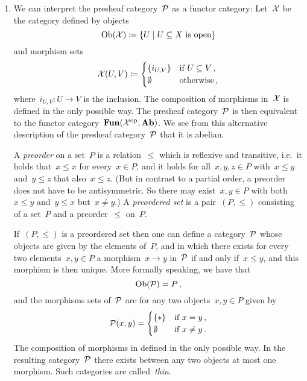 \begin{example}
\begin{enumerate}
    \item
      We can interpret the presheaf category~$\mathcal{P}$ as a functor category:
      Let~$\mathcal{X}$ be the category defined by objects
      \[
                  \Ob(\Xcat)
        \defined  \{
                    U
                  \suchthat
                    \text{$U \subseteq X$ is open}
                  \}
      \]
      and morphism sets
      \[
                  \mathcal{X}(U,V)
        \coloneqq  \begin{cases}
                    \{ i_{U,V} \} & \text{if~$U \subseteq V$} \,, \\
                    \emptyset     & \text{otherwise} \,,
                  \end{cases}
      \]
      where~$i_{U,V} \colon U \to V$ is the inclusion.
      The composition of morphisms in~$\mathcal{X}$ is defined in the only possible way.
      The presheaf category~$\mathcal{P}$ is then equivalent to the functor category~$\mathbf{Fun}(\mathcal{X}^{\mathrm{op}}, \mathbf{Ab})$.
      We see from this alternative description of the presheaf category~$\mathcal{P}$ that it is abelian.
      
      \begin{remark*}
        A \emph{preorder} on a set~$P$ is a relation~$\leq$ which is reflexive and transitive, i.e.\ it holds that~$x \leq x$ for every~$x \in P$, and it holds for all~$x, y, z \in P$ with~$x \leq y$ and~$y \leq z$ that also~$x \leq z$.
        (But in contrast to a partial order, a preorder does not have to be antisymmetric.
        So there may exist~$x, y \in P$ with both~$x \leq y$ and~$y \leq x$ but~$x \neq y$.)
        A \emph{preordered set} is a pair~$(P,\leq)$ consisting of a set~$P$ and a preorder~$\leq$ on~$P$.
        
        If~$(P,\leq)$ is a preordered set then one can define a category~$\mathcal{P}$ whose objects are given by the elements of~$P$, and in which there exists for every two elements~$x, y \in P$ a morphism~$x \to y$ in~$\mathcal{P}$ if and only if~$x \leq y$, and this morphism is then unique.
        More formally speaking, we have that
        \[
            \operatorname{Ob}(\mathcal{P})
          = P \,,
        \]
        and the morphisms sets of~$\mathcal{P}$ are for any two objects~$x, y \in P$ given by
        \[
            \mathcal{P}(x,y)
          = \begin{cases}
              \{\ast\}  & \text{if~$x = y$} \,, \\
              \emptyset & \text{if~$x \neq y$}  \,.
            \end{cases}
        \]
        The composition of morphisms in defined in the only possible way.
        In the resulting category~$\mathcal{P}$ there exists between any two objects at most one morphism.
        Such categories are called~\emph{thin}.
        

\end{remark*}
\end{enumerate}
\end{example}
